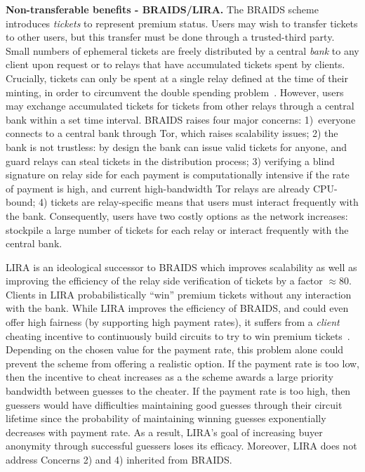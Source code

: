\medskip\noindent \textbf{Non-transferable benefits - BRAIDS/LIRA.}
The BRAIDS scheme introduces \emph{tickets} to represent premium status.
Users may wish to transfer tickets to other users, but this transfer must be done through a trusted-third party.
Small numbers of ephemeral tickets are freely distributed by a central \emph{bank} to any client upon request or to relays that have accumulated tickets spent by clients.
Crucially, tickets can only be spent at a single relay defined at the time of their minting, in order to circumvent the double spending problem~\cite{jansen2010recruiting}.
However, users may exchange accumulated tickets for tickets from other relays through a central bank within a set time interval.
BRAIDS raises four major concerns: 1)~everyone connects to a central bank through Tor, which raises scalability issues; 2) the bank is not trustless: by design the bank can issue valid tickets for anyone, and guard relays can steal tickets in the distribution process; 3) verifying a blind signature on relay side for each payment is computationally intensive if the rate of payment is high, and current high-bandwidth Tor relays are already CPU-bound; 4) tickets are relay-specific means that users must interact frequently with the bank.
Consequently, users have two costly options as the network increases: stockpile a large number of tickets for each relay or interact frequently with the central bank.

LIRA is an ideological successor to BRAIDS which improves scalability as well as improving the efficiency of the relay side verification of tickets by a factor $\approx 80$.
Clients in LIRA probabilistically ``win'' premium tickets without any interaction with the bank.
While LIRA improves the efficiency of BRAIDS, and could even offer high fairness (by supporting high payment rates), it suffers from a \textit{client} cheating incentive to continuously build circuits to try to win premium tickets~\cite{jansen2013lira, jansenblogpost}.
Depending on the chosen value for the payment rate, this problem alone could prevent the scheme from offering a realistic option.
If the payment rate is too low, then the incentive to cheat increases as a the scheme awards a large priority bandwidth between guesses to the cheater.
If the payment rate is too high, then guessers would have difficulties maintaining good guesses through their circuit lifetime since the probability of maintaining winning guesses exponentially decreases with payment rate.
As a result, LIRA's goal of increasing buyer anonymity through successful guessers loses its efficacy.
Moreover, LIRA does not address Concerns 2) and 4) inherited from BRAIDS.

